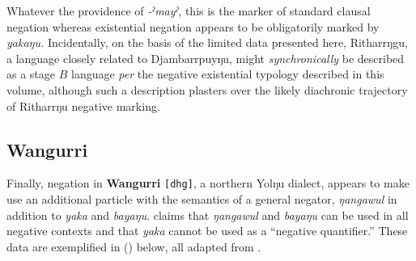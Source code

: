 \documentclass[usenames,dvipsnames,11pt]{article}
\begin{document}
{ Whatever the providence of \textit{-ˀmayˀ}, this is the marker of standard clausal negation whereas existential negation appears to be obligatorily marked by \textit{yakaŋu.} Incidentally, on the basis of the limited data presented here, Ritharrŋgu, a language closely related to Djambarrpuyŋu, might \textit{synchronically} be described as a stage $B$ language \textit{per} the negative existential typology described in this volume, although such a description plasters over the likely diachronic trajectory of Ritharrŋu negative marking.



\subsection{Wangurri}

Finally, negation in \textbf{Wangurri} {\tt[dhg]}, a northern Yolŋu dialect, appears to make use an additional particle with the semantics of a general negator, \textit{ŋangawul} in addition to \textit{yaka} and \textit{bayaŋu}. \citet[195]{McLellan1992} claims that \textit{ŋangawul} and \textit{bayaŋu} can be used in all negative contexts and that \textit{yaka} cannot be used as a ``negative quantifier.'' These data are exemplified in (\nextx) below, all adapted from \citet{McLellan1992}.

}
\end{document}
